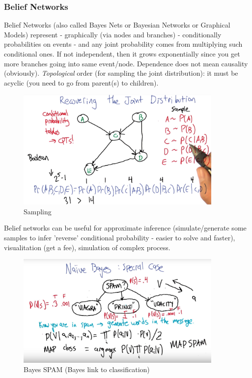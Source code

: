 \documentclass[11pt]{article}
\begin{document}
\subsubsection{Belief Networks}
Belief Networks (also called Bayes Nets or Bayesian Networks or Graphical Models) represent - graphically (via nodes and branches) - conditionally probabilities on events - and any joint probability comes from multiplying such conditional ones. If not independent, then it grows exponentially since you get more branches going into same event/node. Dependence does not mean causality (obviously). \textit{Topological} order (for sampling the joint distribution): it must be acyclic (you need to go from parent(s) to children).

\begin{figure}[htbp] 
	\centering
	\includegraphics[width=0.9\textwidth]{pics/belief_network1}
	\caption{Sampling} 
	\label{belief_network1}
\end{figure}
Belief networks can be useful for approximate inference (simulate/generate some samples to infer 'reverse' conditional probability - easier to solve and faster), visualitation (get a fee), simulation of complex process. 

\begin{figure}[htbp] 
	\centering
	\includegraphics[width=0.9\textwidth]{pics/Bayesian_special_case}
	\caption{Bayes SPAM (Bayes link to classification)} 
	\label{Bayesian_special_case}
\end{figure}
\end{document}
